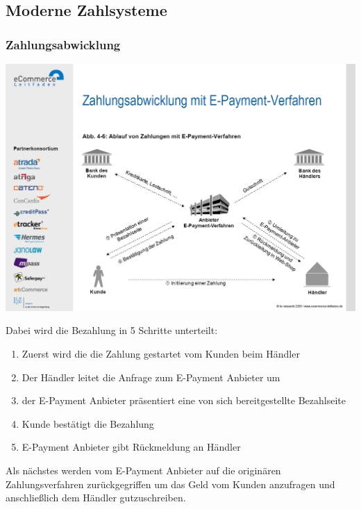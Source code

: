 \subsection{Moderne Zahlsysteme}
\subsubsection{Zahlungsabwicklung}

\begin{minipage}{\linewidth}
	\centering
	\includegraphics[width=1\linewidth]{images/zahlungsabwicklung}
\end{minipage}

Dabei wird die Bezahlung in 5 Schritte unterteilt:

\begin{enumerate}
	\item Zuerst wird die die Zahlung gestartet vom Kunden beim Händler
	\item Der Händler leitet die Anfrage zum E-Payment Anbieter um
	\item der E-Payment Anbieter präsentiert eine von sich bereitgestellte Bezahlseite
	\item Kunde bestätigt die Bezahlung
	\item E-Payment Anbieter gibt Rückmeldung an Händler
\end{enumerate}

Als nächstes werden vom E-Payment Anbieter auf die originären Zahlungsverfahren zurückgegriffen um das Geld vom Kunden anzufragen und anschließlich dem Händler gutzuschreiben. 

